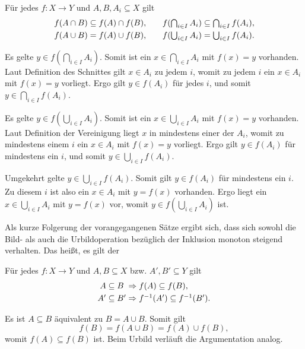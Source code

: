 \begin{Satz}
Für jedes $f\colon X\to Y$ und $A,B,A_i\subseteq X$ gilt
\[\begin{array}{@{}l@{\;}c@{\;}l@{\qquad}l@{\;}c@{\;}l@{}}
f(A\cap B) &\subseteq& f(A)\cap f(B), & f(\bigcap_{i\in I} A_i)&\subseteq&\bigcap_{i\in I} f(A_i),\\[3pt]
f(A\cup B) &=& f(A)\cup f(B), & f(\bigcup_{i\in I} A_i) &=& \bigcup_{i\in I} f(A_i).
\end{array}\]
\end{Satz}
\begin{Beweis}
Es gelte $y\in f(\bigcap_{i\in I} A_i)$. Somit ist ein
$x\in\bigcap_{i\in I}A_i$ mit $f(x)=y$ vorhanden. Laut Definition
des Schnittes gilt $x\in A_i$ zu jedem $i$, womit zu jedem $i$ ein
$x\in A_i$ mit $f(x)=y$ vorliegt. Ergo gilt $y\in f(A_i)$ für jedes $i$,
und somit $y\in\bigcap_{i\in I} f(A_i)$.

Es gelte $y\in f(\bigcup_{i\in I} A_i)$. Somit ist ein $x\in\bigcup_{i\in I}A_i$
mit $f(x)=y$ vorhanden. Laut Definition der Vereinigung liegt $x$ in
mindestens einer der $A_i$, womit zu mindestens einem $i$ ein $x\in A_i$
mit $f(x)=y$ vorliegt. Ergo gilt $y\in f(A_i)$ für mindestens ein
$i$, und somit $y\in\bigcup_{i\in I} f(A_i)$.

Umgekehrt gelte $y\in\bigcup_{i\in I} f(A_i)$. Somit gilt $y\in f(A_i)$
für mindestens ein $i$. Zu diesem $i$ ist also ein $x\in A_i$ mit
$y=f(x)$ vorhanden. Ergo liegt ein $x\in\bigcup_{i\in I} A_i$ mit
$y=f(x)$ vor, womit $y\in f(\bigcup_{i\in I} A_i)$ ist.\,\qedsymbol
\end{Beweis}

\noindent
Als kurze Folgerung der vorangegangenen Sätze ergibt sich, dass sich
sowohl die Bild- als auch die Urbildoperation bezüglich der Inklusion
monoton steigend verhalten. Das heißt, es gilt der
\begin{Satz}
Für jedes $f\colon X\to Y$ und $A,B\subseteq X$ bzw. $A',B'\subseteq Y$ gilt
\[\begin{array}{@{}r@{\;}c@{\;}l@{\;}l@{}}
A &\subseteq& B &\cond f(A)\subseteq f(B),\\[3pt]
A' &\subseteq& B' &\cond f^{-1}(A')\subseteq f^{-1}(B').
\end{array}\]
\end{Satz}
\begin{Beweis}
Es ist $A\subseteq B$ äquivalent zu $B = A\cup B$. Somit gilt
\[f(B) = f(A\cup B) = f(A)\cup f(B),\]
womit $f(A)\subseteq f(B)$ ist. Beim Urbild verläuft
die Argumentation analog.\,\qedsymbol
\end{Beweis}

